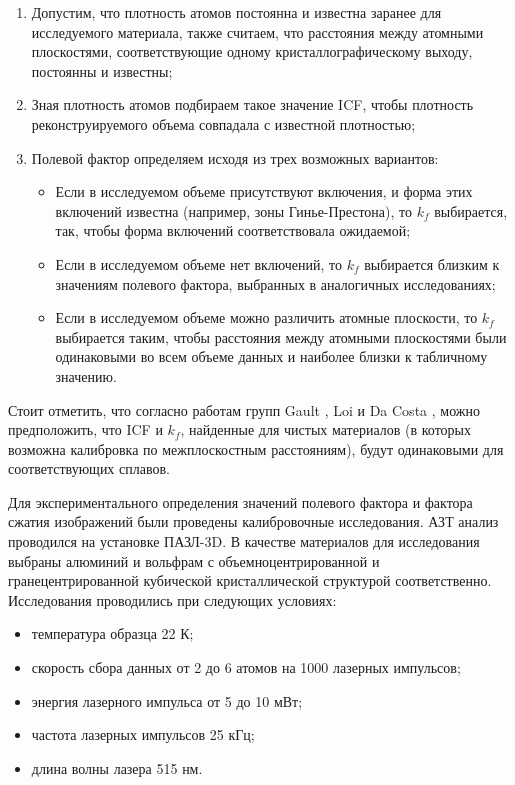 \begin{enumerate}[beginpenalty=10000] %
	\item Допустим, что плотность атомов постоянна и известна заранее для исследуемого материала, также считаем, что расстояния между атомными плоскостями, соответствующие одному кристаллографическому выходу, постоянны и известны;
	\item Зная плотность атомов подбираем такое значение ICF, чтобы плотность реконструируемого объема совпадала с известной плотностью;
	\item Полевой фактор определяем исходя из трех возможных вариантов:
	\begin{itemize} [beginpenalty=10000]
		\item Если в исследуемом объеме присутствуют включения, и форма этих включений известна (например, зоны Гинье-Престона), то $k_f$ выбирается, так, чтобы форма включений соответствовала ожидаемой;
		\item Если в исследуемом объеме нет включений, то $k_f$ выбирается близким к значениям полевого фактора, выбранных в аналогичных исследованиях;
		\item Если в исследуемом объеме можно различить атомные плоскости, то $k_f$ выбирается таким, чтобы расстояния между атомными плоскостями были одинаковыми во всем объеме данных и наиболее близки к табличному значению.
	\end{itemize}
\end{enumerate}

Стоит отметить, что согласно работам групп Gault \cite{Gault11_Loi}, Loi \cite{Loi13} и Da Costa \cite{Hatzoglou19}, можно предположить, что ICF и $k_f$, найденные для чистых материалов (в которых возможна калибровка по межплоскостным расстояниям), будут одинаковыми для соответствующих сплавов.

Для экспериментального определения значений полевого фактора и фактора сжатия изображений были проведены калибровочные исследования. АЗТ анализ проводился на установке ПАЗЛ-3D. В качестве материалов для исследования выбраны алюминий и вольфрам с объемноцентрированной и гранецентрированной кубической кристаллической структурой соответственно. Исследования проводились при следующих условиях:
\begin{itemize}
	\item температура образца 22 К;
	\item скорость сбора данных от 2 до 6 атомов на 1000 лазерных импульсов;
	\item энергия лазерного импульса от 5 до 10 мВт;
	\item частота лазерных импульсов 25 кГц;
	\item длина волны лазера 515 нм.
\end{itemize} 

